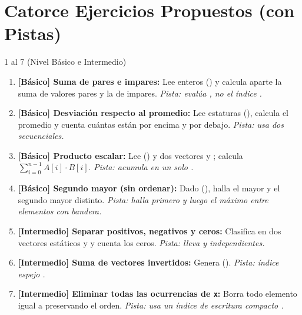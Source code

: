 \documentclass[11pt,letterpaper]{article}
\begin{document}
\section{Catorce Ejercicios Propuestos (con Pistas)}

\begin{ejercicio}{1 al 7 (Nivel Básico e Intermedio)}
\begin{enumerate}
  \item \textbf{[Básico] Suma de pares e impares:} Lee  enteros () y calcula aparte la suma de valores pares y la de impares. \emph{Pista: evalúa , no el índice .}
  \item \textbf{[Básico] Desviación respecto al promedio:} Lee  estaturas (), calcula el promedio y cuenta cuántas están por encima y por debajo. \emph{Pista: usa dos  secuenciales.}
  \item \textbf{[Básico] Producto escalar:} Lee  () y dos vectores  y ; calcula $\sum_{i=0}^{n-1} A[i]\cdot B[i]$. \emph{Pista: acumula en un solo .}
  \item \textbf{[Básico] Segundo mayor (sin ordenar):} Dado  (), halla el mayor y el segundo mayor distinto. \emph{Pista: halla  primero y luego el máximo entre elementos  con bandera.}
  \item \textbf{[Intermedio] Separar positivos, negativos y ceros:} Clasifica  en dos vectores estáticos  y  y cuenta los ceros. \emph{Pista: lleva  y  independientes.}
  \item \textbf{[Intermedio] Suma de vectores invertidos:} Genera  (). \emph{Pista: índice espejo .}
  \item \textbf{[Intermedio] Eliminar todas las ocurrencias de \texttt{x}:} Borra todo elemento igual a  preservando el orden. \emph{Pista: usa un índice de escritura compacto .}
\end{enumerate}
\end{ejercicio}
\end{document}
